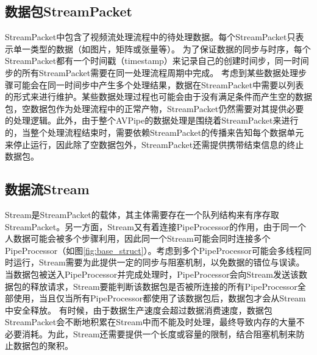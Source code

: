 \subsection{数据包StreamPacket}
StreamPacket中包含了视频流处理流程中的待处理数据。每个StreamPacket只表示单一类型的数据（如图片，矩阵或张量等）。
为了保证数据的同步与时序，每个StreamPacket都有一个时间戳（timestamp）来记录自己的创建时间步，同一时间步的所有StreamPacket需要在同一处理流程周期中完成。
考虑到某些数据处理步骤可能会在同一时间步中产生多个处理结果，数据在StreamPacket中需要以列表的形式来进行维护。某些数据处理过程也可能会由于没有满足条件而产生空的数据包，空数据包作为处理流程中的正常产物，StreamPacket仍然需要对其提供必要的处理逻辑。此外，由于整个AVPipe的数据处理是围绕着StreamPacket来进行的，当整个处理流程结束时，需要依赖StreamPacket的传播来告知每个数据单元来停止运行，因此除了空数据包外，StreamPacket还需提供携带结束信息的终止数据包。
\subsection{数据流Stream}\label{ch4:design_stream}
Stream是StreamPacket的载体，其主体需要存在一个队列结构来有序存取StreamPacket。另一方面，Stream又有着连接PipeProcessor的作用，由于同一个人数据可能会被多个步骤利用，因此同一个Stream可能会同时连接多个PipeProcessor（如图\ref{fig:base_struct}）。考虑到多个PipeProcessor可能会多线程同时运行，Stream需要为此提供一定的同步与阻塞机制，以免数据的错位与误读。
当数据包被送入PipeProcessor并完成处理时，PipeProcessor会向Stream发送该数据包的释放请求，Stream要能判断该数据包是否被所连接的所有PipeProcessor全部使用，当且仅当所有PipeProcessor都使用了该数据包后，数据包才会从Stream中安全释放。
有时候，由于数据生产速度会超过数据消费速度，数据包StreamPacket会不断地积累在Stream中而不能及时处理，最终导致内存的大量不必要消耗。为此，Stream还需要提供一个长度或容量的限制，结合阻塞机制来防止数据包的聚积。

